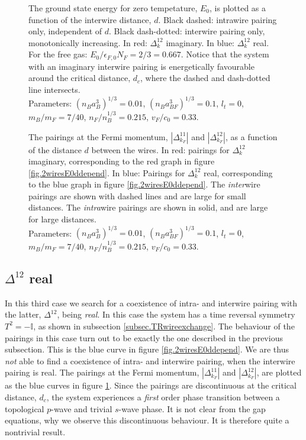 \begin{figure} 
\begin{center}  
  
\caption{The ground state energy for zero tempetature, $E_0$, is plotted as a function of the interwire distance, $d$. Black dashed: intrawire pairing only, independent of $d$. Black dash-dotted: interwire pairing only, monotonically increasing. In red: $\Delta^{12}_k$ imaginary. In blue: $\Delta^{12}_k$ real. For the free gas: $E_0/\epsilon_{F,0}N_F = 2/3 = 0.667$. Notice that the system with an imaginary interwire pairing is energetically favourable around the critical distance, $d_c$, where the dashed and dash-dotted line intersects. \\
Parameters: $(n_Ba_B^3)^{1/3} = 0.01$, $(n_Ba_{BF}^3)^{1/3} = 0.1$, $l_t = 0$, $m_B / m_F = 7/40$, $n_F / n_B^{1/3} = 0.215$, $v_F/c_0 = 0.33$. }  
\label{fig.2wiresE0ddepend}  
\vspace{0.5cm}
  
\caption{The pairings at the Fermi momentum, $\left|\Delta^{11}_{k_F}\right|$ and $\left|\Delta^{12}_{k_F}\right|$, as a function of the distance $d$ between the wires. In red: pairings for $\Delta^{12}_k$ imaginary, corresponding to the red graph in figure \ref{fig.2wiresE0ddepend}. In blue: Pairings for $\Delta^{12}_k$ real, corresponding to the blue graph in figure \ref{fig.2wiresE0ddepend}. The \textit{inter}wire pairings are shown with dashed lines and are large for small distances. The \textit{intra}wire pairings are shown in solid, and are large for large distances. \\
Parameters: $(n_Ba_B^3)^{1/3} = 0.01$, $(n_Ba_{BF}^3)^{1/3} = 0.1$, $l_t = 0$, $m_B / m_F = 7/40$, $n_F / n_B^{1/3} = 0.215$, $v_F/c_0 = 0.33$. }
\label{fig.2wiresMaximalPairingddepend}
\end{center}
\end{figure}

\subsection{\texorpdfstring{$\Delta^{12}$}{Interwire pairing} real}
In this third case we search for a coexistence of intra- and interwire pairing with the latter, $\Delta^{12}$, being \textit{real}. In this case the system has a time reversal symmetry $T^2 = -\mathbb{I}$, as shown in subsection \ref{subsec.TRwireexchange}. The behaviour of the pairings in this case turn out to be exactly the one described in the previous subsection. This is the blue curve in figure \ref{fig.2wiresE0ddepend}. We are thus \textit{not} able to find a coexistence of intra- and interwire pairing, when the interwire pairing is real. The pairings at the Fermi momentum, $|\Delta^{11}_{k_F}|$ and $|\Delta^{12}_{k_F}|$, are plotted as the blue curves in figure \ref{fig.2wiresMaximalPairingddepend}. Since the pairings are discontinuous at the critical distance, $d_c$, the system experiences a \textit{first} order phase transition between a topological $p$-wave and trivial $s$-wave phase. It is not clear from the gap equations, why we observe this discontinuous behaviour. It is therefore quite a nontrivial result.  

